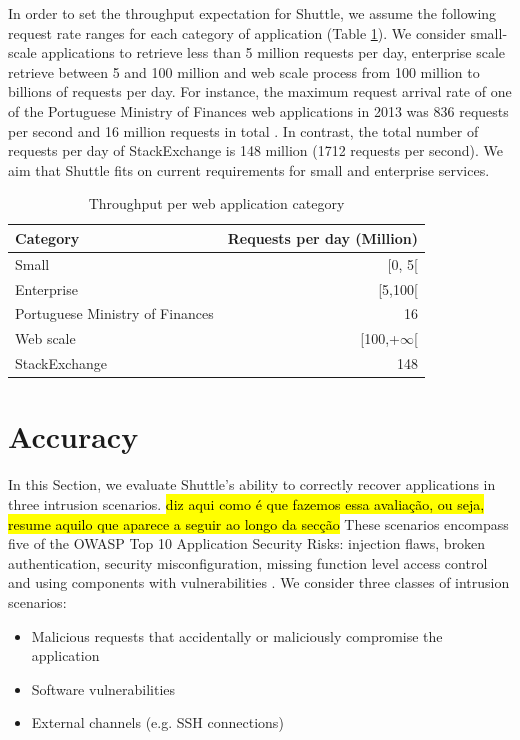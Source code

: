 In order to set the throughput expectation for Shuttle, we assume the following request rate ranges for each category of application (Table \ref{tab:base_throughputs}). We consider small-scale applications to retrieve less than 5 million requests per day, enterprise scale retrieve between 5 and 100 million and web scale process from 100 million to billions of requests per day.
For instance, the maximum request arrival rate of one of the Portuguese Ministry of Finances web applications in 2013 was 836 requests per second and 16 million requests in total \cite{opensoft}. In contrast, the total number of requests per day of StackExchange is 148 million (1712 requests per second). We aim that Shuttle fits on current requirements for small and enterprise services. 

\begin{table}[ht]
    \centering
    \begin{tabular}{lr}
      \bf{Category}                          & \bf{Requests per day (Million)}  \\ \hline
      Small                                  & [0, 5[                           \\
      Enterprise                             & [5,100[                          \\
      Portuguese Ministry of Finances        & 16                               \\
      Web scale                              & [100,+$\infty$[                  \\
      StackExchange                          & 148                              \\
    \end{tabular}
    \caption{Throughput per web application category}
    \label{tab:base_throughputs}
\end{table}


\section{Accuracy}\label{sec:eval:accuracy}

In this Section, we evaluate Shuttle's ability to correctly recover applications in three intrusion scenarios. \hl{diz aqui como é que fazemos essa avaliação, ou seja, resume aquilo que aparece a seguir ao longo da secção} These scenarios encompass five of the \acf{OWASP} Top 10 Application Security Risks: injection flaws, broken authentication, security misconfiguration, missing function level access control and using components with vulnerabilities \cite{Williams2013}. We consider three classes of intrusion scenarios:
\begin{itemize}
  \item Malicious requests that accidentally or maliciously compromise the application
  \item Software vulnerabilities
  \item External channels (e.g. \ac{SSH} connections)
\end{itemize}

